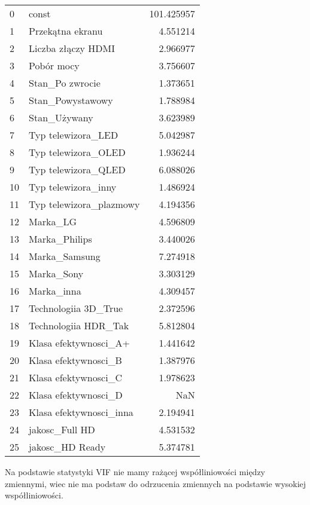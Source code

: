 \documentclass[11pt,a4paper]{article}
\begin{document}
\begin{center}
\begin{tabular}{llr}
			 	0  &                    const &  101.425957 \\
			 	1  &         Przekątna ekranu &    4.551214 \\
			 	2  &       Liczba złączy HDMI &    2.966977 \\
			 	3  &               Pobór mocy &    3.756607 \\
			 	4  &          Stan\_Po zwrocie &    1.373651 \\
			 	5  &         Stan\_Powystawowy &    1.788984 \\
			 	6  &             Stan\_Używany &    3.623989 \\
			 	7  &       Typ telewizora\_LED &    5.042987 \\
			 	8  &      Typ telewizora\_OLED &    1.936244 \\
			 	9  &      Typ telewizora\_QLED &    6.088026 \\
			 	10 &      Typ telewizora\_inny &    1.486924 \\
			 	11 &  Typ telewizora\_plazmowy &    4.194356 \\
			 	12 &                 Marka\_LG &    4.596809 \\
			 	13 &            Marka\_Philips &    3.440026 \\
			 	14 &            Marka\_Samsung &    7.274918 \\
			 	15 &               Marka\_Sony &    3.303129 \\
			 	16 &               Marka\_inna &    4.309457 \\
			 	17 &      Technologiia 3D\_True &    2.372596 \\
			 	18 &      Technologiia HDR\_Tak &    5.812804 \\
			 	19 &    Klasa efektywnosci\_A+ &    1.441642 \\
			 	20 &     Klasa efektywnosci\_B &    1.387976 \\
			 	21 &     Klasa efektywnosci\_C &    1.978623 \\
			 	22 &     Klasa efektywnosci\_D &         NaN \\
			 	23 &  Klasa efektywnosci\_inna &    2.194941 \\
			 	24 &           jakosc\_Full HD &    4.531532 \\
			 	25 &          jakosc\_HD Ready &    5.374781 \\
			 	 
			 \end{tabular}
		 \end{center}
	 	Na podstawie statystyki VIF nie mamy rażącej współliniowości między zmiennymi, wiec nie ma podstaw do odrzucenia zmiennych na podstawie wysokiej współliniowości.
\end{document}
